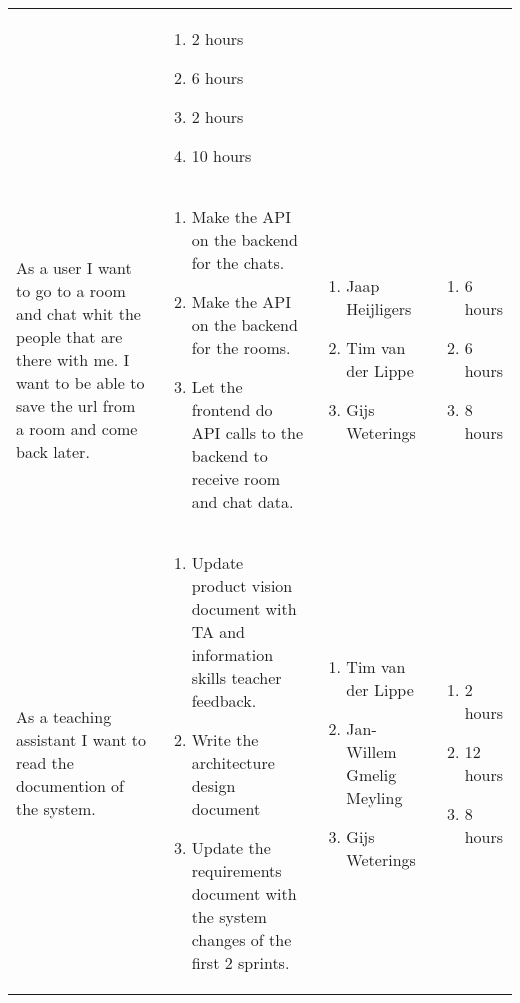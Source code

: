 \documentclass[11pt,a4paper]{article}
\begin{document}
\begin{table}[h]
\begin{tabular}{|p{4.5cm}|p{7cm}|p{4cm}|p{2.6cm}|}
&

\begin{enumerate}
\item 2 hours
\item 6 hours
\item 2 hours
\item 10 hours
\end{enumerate}

\\

As a user I want to go to a room and chat whit the people that are there with me.
I want to be able to save the url from a room and come back later.
&
\begin{enumerate}
\item Make the API on the backend for the chats.
\item Make the API on the backend for the rooms.
\item Let the frontend do API calls to the backend to receive room and chat data.
\end{enumerate}

&

\begin{enumerate}
\item Jaap Heijligers
\item Tim van der Lippe
\item Gijs Weterings
\end{enumerate}

&
\begin{enumerate}
\item 6 hours
\item 6 hours
\item 8 hours
\end{enumerate}
           
\\

As a teaching assistant I want to read the documention of the system.
&
\begin{enumerate}
\item Update product vision document with TA and information skills teacher feedback.
\item Write the architecture design document
\item Update the requirements document with the system changes of the first 2 sprints.
\end{enumerate} 
           
&
\begin{enumerate}
\item Tim van der Lippe
\item Jan-Willem Gmelig Meyling
\item Gijs Weterings
\end{enumerate}
           
&

\begin{enumerate}
\item 2 hours
\item 12 hours
\item 8 hours
\end{enumerate}

           
\end{tabular}
\end{table}
\end{document}
